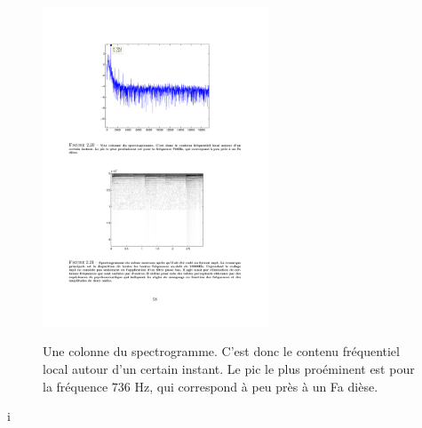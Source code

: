 \begin{figure}
  \centering
  \includegraphics[width=0.6\textwidth]{Figures/Figure2-20}\\
  \caption{Une colonne du spectrogramme. C'est donc le contenu fr\'{e}quentiel local autour d'un certain instant. Le pic le plus pro\'{e}minent est pour la fr\'{e}quence $736$ Hz, qui correspond \`{a} peu pr\`{e}s \`{a} un Fa di\`{e}se.}\label{fig:figure2-20}
\end{figure}

i 
